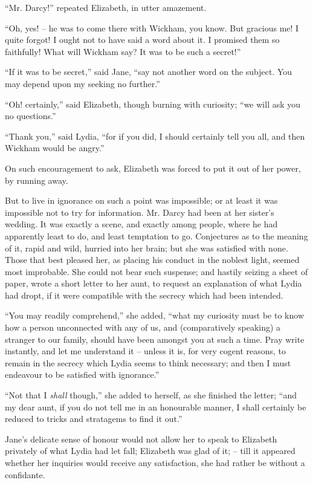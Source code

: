 “Mr. Darcy!” repeated Elizabeth, in utter amazement.

“Oh, yes! -- he was to come there with Wickham, you
know. But gracious me! I quite forgot! I ought not to
have said a word about it. I promised them so faithfully!
What will Wickham say? It was to be such a secret!”

“If it was to be secret,” said Jane, “say not another
word on the subject. You may depend upon my seeking
no further.”

“Oh! certainly,” said Elizabeth, though burning with
curiosity; “we will ask you no questions.”

“Thank you,” said Lydia, “for if you did, I should
certainly tell you all, and then Wickham would be
angry.”

On such encouragement to ask, Elizabeth was forced
to put it out of her power, by running away.

But to live in ignorance on such a point was impossible;
or at least it was impossible not to try for information.
Mr. Darcy had been at her sister’s wedding. It was
exactly a scene, and exactly among people, where he had
apparently least to do, and least temptation to go. Conjectures
as to the meaning of it, rapid and wild, hurried
into her brain; but she was satisfied with none. Those
that best pleased her, as placing his conduct in the noblest
light, seemed most improbable. She could not bear such
suspense; and hastily seizing a sheet of paper, wrote
a short letter to her aunt, to request an explanation of
what Lydia had dropt, if it were compatible with the
secrecy which had been intended.

“You may readily comprehend,” she added, “what my
curiosity must be to know how a person unconnected with
any of us, and (comparatively speaking) a stranger to our
family, should have been amongst you at such a time.
Pray write instantly, and let me understand it -- unless it
is, for very cogent reasons, to remain in the secrecy which
Lydia seems to think necessary; and then I must endeavour
to be satisfied with ignorance.”

“Not that I \textit{shall} though,” she added to herself, as
she finished the letter; “and my dear aunt, if you do
not tell me in an honourable manner, I shall certainly
be reduced to tricks and stratagems to find it out.”

Jane’s delicate sense of honour would not allow her to
speak to Elizabeth privately of what Lydia had let fall;
Elizabeth was glad of it; -- till it appeared whether her
inquiries would receive any satisfaction, she had rather
be without a confidante.

